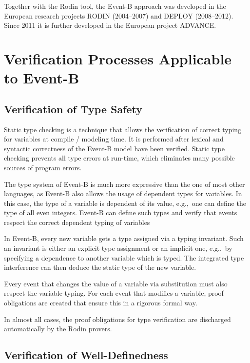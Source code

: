 \documentclass{article}
\begin{document}
Together with the Rodin tool, the Event-B approach was developed in the European
research projects RODIN (2004--2007) and DEPLOY (2008--2012). Since 2011 it is
further developed in the European project ADVANCE\@.


\section{Verification Processes Applicable to Event-B}
\label{sec:verif-proc-appl}


\subsection{Verification of Type Safety}
\label{sec:verif-type-safety}

Static type checking is a technique that allows the verification of correct
typing for variables at compile / modeling time. It is performed after lexical
and syntactic correctness of the Event-B model have been verified. Static type
checking prevents all type errors at run-time, which eliminates many possible
sources of program errors.

The type system of Event-B is much more expressive than the one of most other
languages, as Event-B also allows the usage of dependent types for variables. In
this case, the type of a variable is dependent of its value, e.g.,\ one can
define the type of all even integers. Event-B can define such types and verify
that events respect the correct dependent typing of variables

In Event-B, every new variable gets a type assigned via a typing invariant. Such
an invariant is either an explicit type assignment or an implicit one, e.g.,\ by
specifying a dependence to another variable which is typed. The integrated type
interference can then deduce the static type of the new variable.

Every event that changes the value of a variable via substitution must also
respect the variable typing. For each event that modifies a variable,  proof
obligations are created that ensure this in a rigorous formal way.

In almost all cases, the proof obligations for type verification are discharged
automatically by the Rodin provers.

\subsection{Verification of Well-Definedness}
\label{sec:verif-well-defin}
\end{document}
